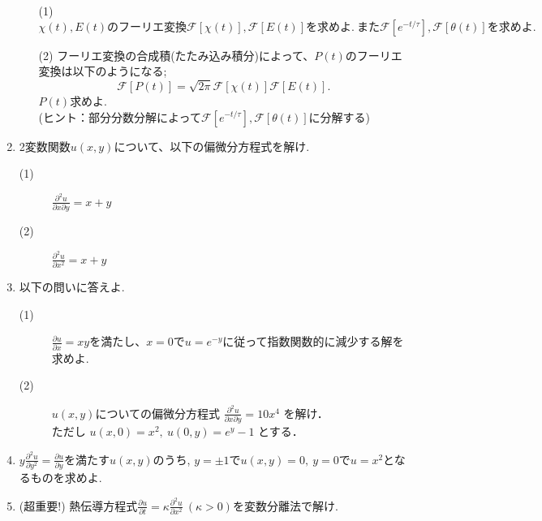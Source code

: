 \documentclass[11pt]{jsarticle}
\begin{document}
\begin{enumerate}
\begin{enumerate}
\item[(1)] $\chi (t),E(t)のフーリエ変換\mathcal{F}[\chi (t)],\mathcal{F}[E(t)] を求めよ.~また\mathcal{F}[e^{-t/\tau}],\mathcal{F}[\theta (t)]を求めよ.$

\newpage
\item[(2)] フーリエ変換の合成積(たたみ込み積分)によって、$P(t)$のフーリエ変換は以下のようになる;
\begin{equation*}
\mathcal{F}[P(t)]=\sqrt{2\pi}\mathcal{F}[\chi (t)]\mathcal{F}[E(t)].
\end{equation*}
$P(t)$求めよ.\\
(ヒント：部分分数分解によって$\mathcal{F}[e^{-t/\tau}],\mathcal{F}[\theta (t)]$に分解する)
\end{enumerate}

\newpage
\item 2変数関数$u(x,y)$について、以下の偏微分方程式を解け.\\
\begin{description}
\item[(1)] $\displaystyle{\frac{{\partial}^2 u}{\partial x \partial y}=x+y}$\\
\item[(2)] $\displaystyle{\frac{{\partial}^2 u}{\partial x^2}=x+y}$
\end{description}

\newpage
\item 以下の問いに答えよ.\\
\begin{description}
\item[(1)] $\displaystyle{\frac{\partial  u}{\partial x}=xy}$を満たし、$x=0$で$u=e^{-y}$に従って指数関数的に減少する解を求めよ.
\item[(2)] $u(x,y)$についての偏微分方程式
$\displaystyle{\frac{\partial^2u}{\partial x \partial y}=10x^4}$ を解け．\\
ただし $u(x,0)=x^2, \ u(0,y)=e^y-1$ とする．
\end{description}

\newpage
\item
$\displaystyle{y\frac{\partial^2u}{\partial y^2}=
\frac{\partial u}{\partial y}}$を満たす$u(x,y)$のうち,
$y=\pm1$で$u(x,y)=0,\ y=0$で$u=x^2$となるものを求めよ.

\newpage
\item (超重要!) 熱伝導方程式$\displaystyle{\frac{\partial u}{\partial t} =
\kappa \frac{\partial^2 u}{\partial x^2}~(\kappa >0)}$を変数分離法で解け.


\end{enumerate}
\end{document}
